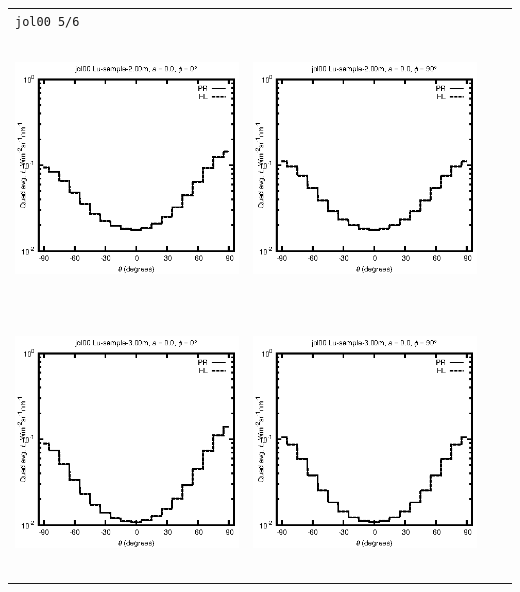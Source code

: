 \begin{tabular}{c c c c}
\multicolumn{4}{l}{\texttt{jol00 5/6}} \\
\includegraphics[height=7cm]{../eps/jol00_Lu_sample_2.00m_fwd.eps} &
\includegraphics[height=7cm]{../eps/jol00_Lu_sample_2.00m_cross.eps} \\
\includegraphics[height=7cm]{../eps/jol00_Lu_sample_3.00m_fwd.eps} &
\includegraphics[height=7cm]{../eps/jol00_Lu_sample_3.00m_cross.eps} \\

\end{tabular}
